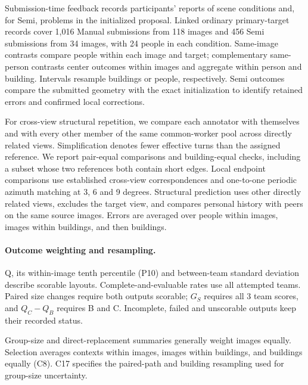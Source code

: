 Submission-time feedback records participants' reports of scene conditions and, for Semi, problems in the initialized proposal. Linked ordinary primary-target records cover 1,016 Manual submissions from 118 images and 456 Semi submissions from 34 images, with 24 people in each condition. Same-image contrasts compare people within each image and target; complementary same-person contrasts center outcomes within images and aggregate within person and building. Intervals resample buildings or people, respectively. Semi outcomes compare the submitted geometry with the exact initialization to identify retained errors and confirmed local corrections.

For cross-view structural repetition, we compare each annotator with themselves and with every other member of the same common-worker pool across directly related views. Simplification denotes fewer effective turns than the assigned reference. We report pair-equal comparisons and building-equal checks, including a subset whose two references both contain short edges. Local endpoint comparisons use established cross-view correspondences and one-to-one periodic azimuth matching at 3, 6 and 9 degrees. Structural prediction uses other directly related views, excludes the target view, and compares personal history with peers on the same source images. Errors are averaged over people within images, images within buildings, and then buildings.



\paragraph{Outcome weighting and resampling.}

Q, its within-image tenth percentile (P10) and between-team standard deviation describe scorable layouts. Complete-and-evaluable rates use all attempted teams. Paired size changes require both outputs scorable; $G_S$ requires all 3 team scores, and $Q_C-Q_B$ requires B and C. Incomplete, failed and unscorable outputs keep their recorded status.

Group-size and direct-replacement summaries generally weight images equally. Selection averages contexts within images, images within buildings, and buildings equally (C8). C17 specifies the paired-path and building resampling used for group-size uncertainty.
